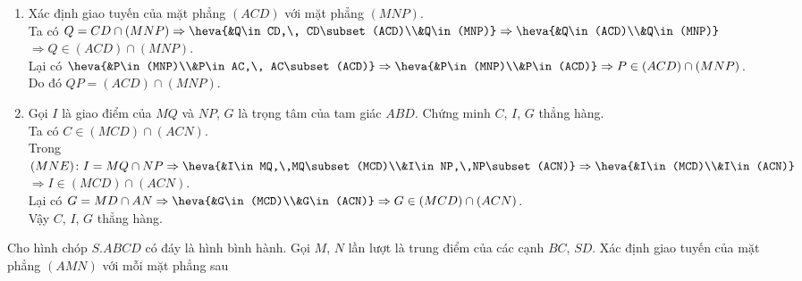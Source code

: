 \begin{bt}
\begin{bt}
{\begin{enumerate}
			Trong $(BCD)$ gọi $Q=CD\cap NE\Rightarrow \heva{&Q\in CD\\&Q\in NE,\, NE\subset (MNP)}\Rightarrow \heva{&Q\in CD\\&Q\in (MNP)}$\\
			$\Rightarrow Q=CD\cap (MNP)$.
			\item Xác định giao tuyến của mặt phẳng $(ACD)$ với mặt phẳng $(MNP)$.\\
			Ta có $Q=CD\cap (MNP)\Rightarrow \heva{&Q\in CD,\, CD\subset (ACD)\\&Q\in (MNP)}\Rightarrow \heva{&Q\in (ACD)\\&Q\in (MNP)}$\\
			$\Rightarrow Q\in (ACD)\cap (MNP)$.\\
			Lại có $\heva{&P\in (MNP)\\&P\in AC,\, AC\subset (ACD)}\Rightarrow \heva{&P\in (MNP)\\&P\in (ACD)}\Rightarrow P\in (ACD)\cap (MNP)$.\\
			Do đó $QP=(ACD)\cap (MNP)$.
			\item Gọi $I$ là giao điểm của $MQ$ và $NP$, $G$ là trọng tâm của tam giác $ABD$. Chứng minh $C$, $I$, $G$ thẳng hàng.\\
			Ta có $C\in (MCD)\cap (ACN)$.\\
			Trong $(MNE)\colon I=MQ\cap NP\Rightarrow \heva{&I\in MQ,\,MQ\subset (MCD)\\&I\in NP,\,NP\subset (ACN)}\Rightarrow \heva{&I\in (MCD)\\&I\in (ACN)}$\\
			$\Rightarrow I\in (MCD)\cap (ACN)$.\\
			Lại có $G=MD\cap AN\Rightarrow \heva{&G\in (MCD)\\&G\in (ACN)}\Rightarrow G\in (MCD)\cap (ACN)$.\\
			Vậy $C$, $I$, $G$ thẳng hàng.
		\end{enumerate}
	}
\end{bt}

\begin{bt}%
	Cho hình chóp $S.ABCD$ có đáy là hình bình hành. Gọi $M$, $N$ lần lượt là trung điểm của các cạnh $BC$, $SD$. Xác định giao tuyến của mặt phẳng $(AMN)$ với mỗi mặt phẳng sau
	

\end{bt}
\end{bt}
